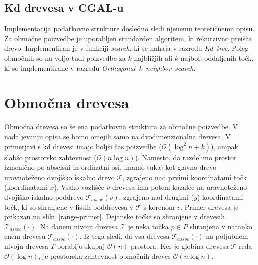\documentclass[a4paper, 12pt]{book}
\newcommand{\T}{\ensuremath{\mathcal{T}}}
\newcommand{\OO}{\ensuremath{\mathcal{O}}} %
\newcommand{\U}{\texttt{\_}}
\begin{document}
\subsection{Kd drevesa v CGAL-u}
Implementacija podatkovne strukture dosledno sledi njenemu teoretičnemu opisu. Za območne poizvedbe je uporabljen standarden algoritem, ki rekurzivno preišče drevo. Implementiran je v funkciji \textit{search}, ki se nahaja v razredu \textit{Kd\U tree}. Poleg območnih so na voljo tudi poizvedbe za $k$ najbližjih ali $k$ najbolj oddaljenih točk, ki so implementirane v razredu \textit{Ortho\-go\-nal\U k\U neigh\-bor\U search}. 

\section{Območna drevesa}
Območna drevesa so še ena podatkovna struktura za območne poizvedbe. V nadaljevanju opisa se bomo omejili samo na dvodimenzionalna drevesa. V primerjavi s kd drevesi imajo boljši čas poizvedbe ($\OO(\log^2 n + k)$), ampak slabšo prostorsko zahtevnost ($\OO(n\log n)$). Namesto, da razdelimo prostor izmenično po abscisni in ordinatni osi, imamo tukaj kot glavno drevo uravnoteženo dvojiško iskalno drevo $\T$, zgrajeno nad prvimi koordinatami točk (koordinatami $x$). Vsako vozlišče $v$ drevesa ima potem kazalec na uravnoteženo dvojiško iskalno poddrevo $\T_{assoc}(v)$, zgrajeno nad drugimi ($y$) koordinatami točk, ki so shranjene v listih poddrevesa v $\T$ s korenom $v$. Primer drevesa je prikazan na sliki~\ref{range-primer}.
Dejanske točke so shranjene v drevesih $\T_{assoc}(\cdot)$. Na danem nivoju drevesa $\T$ je neka točka $p \in P$ shranjena v natanko enem drevesu $\T_{assoc}(\cdot)$. Iz tega sledi, da vsa drevesa $\T_{assoc}(\cdot)$ na poljubnem nivoju drevesa $T$ porabijo skupaj $\OO(n)$ prostora. Ker je globina drevesa $\T$ reda $\OO(\log n)$, je prostorska zahtevnost območnih dreves $\OO(n\log n)$.
\end{document}
